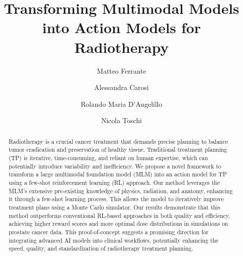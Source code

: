 \documentclass[runningheads]{llncs}
\begin{document}
\title{Transforming Multimodal Models into Action Models for Radiotherapy}




\author{Matteo Ferrante  \and Alessandra Carosi  \and Rolando Maria D'Angelillo  \and Nicola Toschi }



\maketitle         

\begin{abstract}
Radiotherapy is a crucial cancer treatment that demands precise planning to balance tumor eradication and preservation of healthy tissue. Traditional treatment planning (TP) is iterative, time-consuming, and reliant on human expertise, which can potentially introduce variability and inefficiency. We propose a novel framework to transform a large multimodal foundation model (MLM) into an action model for TP using a few-shot reinforcement learning (RL) approach. Our method leverages the MLM's extensive pre-existing knowledge of physics, radiation, and anatomy, enhancing it through a few-shot learning process. This allows the model to iteratively improve treatment plans using a Monte Carlo simulator. Our results demonstrate that this method outperforms conventional RL-based approaches in both quality and efficiency, achieving higher reward scores and more optimal dose distributions in simulations on prostate cancer data. This proof-of-concept suggests a promising direction for integrating advanced AI models into clinical workflows, potentially enhancing the speed, quality, and standardization of radiotherapy treatment planning.

\end{abstract}
\end{document}
